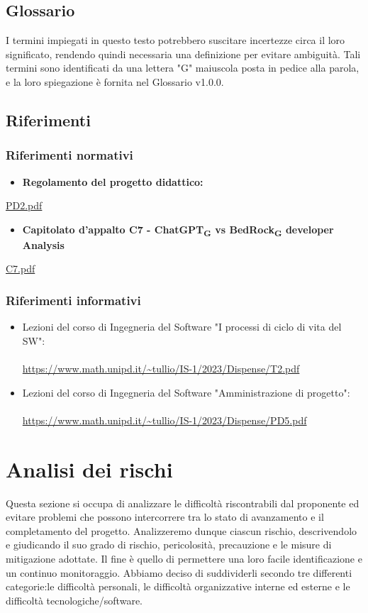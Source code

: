 \documentclass{article}
\begin{document}
\subsection{Glossario}
I termini impiegati in questo testo potrebbero suscitare incertezze circa il loro significato, rendendo quindi necessaria una definizione per evitare ambiguità. Tali termini sono identificati da una lettera "G" maiuscola posta in pedice alla parola, e la loro spiegazione è fornita nel Glossario v1.0.0.

\subsection{Riferimenti}
\subsubsection{Riferimenti normativi}
\begin{itemize}
    \item \textbf{Regolamento del progetto didattico:}
\end{itemize}
\href{https://www.math.unipd.it/~tullio/IS-1/2023/Dispense/PD2.pdf}{PD2.pdf}
\begin{itemize}
    \item \textbf{Capitolato d'appalto C7 - ChatGPT\textsubscript{G} vs BedRock\textsubscript{G} developer Analysis}
\end{itemize}
\href{https://www.math.unipd.it/~tullio/IS-1/2023/Progetto/C7.pdf}{C7.pdf}

\subsubsection{Riferimenti informativi}
\begin{itemize}
\item Lezioni del corso di Ingegneria del Software "I processi di ciclo di vita del SW": \\ \\
\url{https://www.math.unipd.it/~tullio/IS-1/2023/Dispense/T2.pdf} 
\item Lezioni del corso di Ingegneria del Software "Amministrazione di progetto": \\ \\
\url{https://www.math.unipd.it/~tullio/IS-1/2023/Dispense/PD5.pdf}
\end{itemize}

\section{Analisi dei rischi}
Questa sezione si occupa di analizzare le difficoltà riscontrabili dal proponente ed evitare problemi che possono intercorrere tra lo stato di avanzamento e il completamento del progetto. Analizzeremo dunque ciascun rischio, descrivendolo e giudicando il suo grado di rischio, pericolosità, precauzione e le misure di mitigazione adottate. Il fine è quello di permettere una loro facile identificazione e un continuo monitoraggio. Abbiamo deciso di suddividerli secondo tre differenti categorie:le difficoltà personali, le difficoltà organizzative interne ed esterne e le difficoltà tecnologiche/software.
\end{document}
